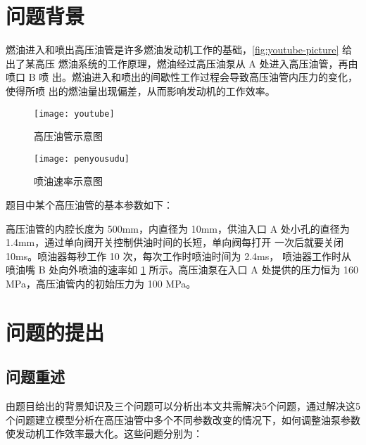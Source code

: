 \documentclass[withoutpreface,bwprint]{cumcmthesis} %
\begin{document}
\section{问题背景}
燃油进入和喷出高压油管是许多燃油发动机工作的基础，\cref{fig:youtube-picture} 给出了某高压
燃油系统的工作原理，燃油经过高压油泵从 A 处进入高压油管，再由喷口 B 喷
出。燃油进入和喷出的间歇性工作过程会导致高压油管内压力的变化，使得所喷
出的燃油量出现偏差，从而影响发动机的工作效率。

\begin{figure}[!h]
	\centering %
	\begin{minipage}[b]{0.4\textwidth} %
		\centering %
		\texttt{[image: youtube]} %
		\caption{高压油管示意图}
		\label{fig:youtube-picture}
	\end{minipage}
	\begin{minipage}[b]{0.4\textwidth} %
		\centering %
		\texttt{[image: penyousudu]}%
		\caption{喷油速率示意图}
		\label{fig:penyou-picture}
	\end{minipage}
\end{figure}
题目中某个高压油管的基本参数如下：

高压油管的内腔长度为 500mm，内直径为 10mm，供油入口
A 处小孔的直径为 1.4mm，通过单向阀开关控制供油时间的长短，单向阀每打开
一次后就要关闭 10ms。喷油器每秒工作 10 次，每次工作时喷油时间为 2.4ms，
喷油器工作时从喷油嘴 B 处向外喷油的速率如 \cref{fig:penyou-picture} 所示。高压油泵在入口 A 处提供的压力恒为 160 MPa，高压油管内的初始压力为 100 MPa。
\section{问题的提出}
\subsection{问题重述}
由题目给出的背景知识及三个问题可以分析出本文共需解决5个问题，通过解决这5个问题建立模型分析在高压油管中多个不同参数改变的情况下，如何调整油泵参数使发动机工作效率最大化。这些问题分别为：
\end{document}
